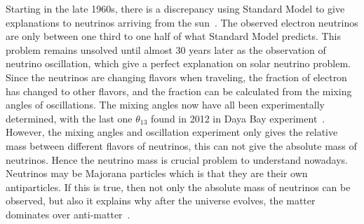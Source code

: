 \documentclass[aps,prd,twocolumn,nofootinbib]{revtex4-1}
\begin{document}
Starting in the late 1960s, there is a discrepancy using Standard Model to give explanations to neutrinos arriving from the sun~\cite{ping2}. The observed electron neutrinos are only between one third to one half of what Standard Model predicts. This problem remains unsolved until almost 30 years later as the observation of neutrino oscillation, which give a perfect explanation on solar neutrino problem. Since the neutrinos are changing flavors when traveling, the fraction of electron has changed to other flavors, and the fraction can be calculated from the mixing angles of oscillations. The mixing angles now have all been experimentally determined, with the last one $\theta_{13}$ found in 2012 in Daya Bay experiment~\cite{ping3}. However, the mixing angles and oscillation experiment only gives the relative mass between different flavors of neutrinos, this can not give the absolute mass of neutrinos. Hence the neutrino mass is crucial problem to understand nowadays. Neutrinos may be Majorana particles which is that they are their own antiparticles. If this is true, then not only the absolute mass of neutrinos can be observed, but also it explains why after the universe evolves, the matter dominates over anti-matter~\cite{ping4}.

\end{document}
